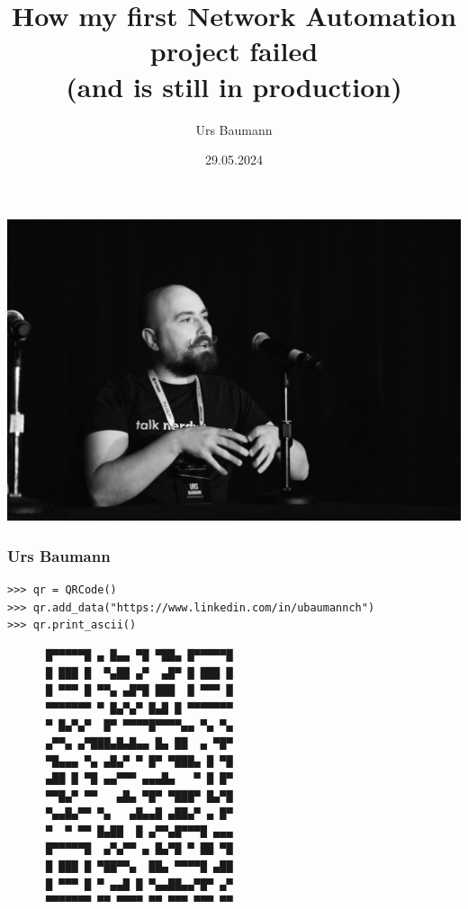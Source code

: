 \documentclass[aspectratio=169]{beamer}
\title[How my first Network Automation project failed (and is still in production)]{How my first Network Automation project failed \\ (and is still in production)}
\author{Urs Baumann}
\institute{Swisscom}
\date{29.05.2024}
\begin{document}
{
{
  \includegraphics[height=\paperheight]{images/AutoCon_0-108.jpg}
}
\frame{\titlepage}
}



\begin{frame}[fragile]
  \frametitle{Urs Baumann}

  \begin{verbatim}
>>> qr = QRCode()
>>> qr.add_data("https://www.linkedin.com/in/ubaumannch")
>>> qr.print_ascii()
  \end{verbatim}
  \begin{verbatim}
      █▀▀▀▀▀█ ▄ █▄▄ ▀█ ▀██▄ █▀▀▀▀▀█
      █ ███ █  ▀▄██ ▄▀  ▄█▀ █ ███ █
      █ ▀▀▀ █ ▀▀▄ ▄█▀█ ███  █ ▀▀▀ █
      ▀▀▀▀▀▀▀ ▀ █▄▀▄▀ █▄█ █ ▀▀▀▀▀▀▀
      ▀ █▄▀▄▀  █▀ ▀▀▀▀█▀▀▀▀▄▄ ▀▄ ▀▄
      ▄▀▀▄ ▄▀███▄█▄█▄▄ █▄ ██  ▄ ▀█▀
      ▀█▄▄▄ ▀▄ ▄█▄▀ ▀ █▀ ▀███▄ █ ▀█
      ▄██ █ ▀█ ▄▄▀▀▀ ▄▄▄█▄   ▀ █ █▀
      ▀▀█▄▀ ▀▀   ▄█▄ ▀█▀ ▀███▀ █▄▀█
      ▀▄▄█▄▀▀ ▀▄   ▄█▄▄█ ▄██▄▀ ▄ █▀
      ▀  ▀ ▀▀ █▄██  █ ▄▀▀▄█▀▀▀█ ▄▄▄
      █▀▀▀▀▀█  ▄▀▄▀▀ ▄ █▄▀█ ▀ ██ ▀█
      █ ███ █ ▀██▀▀▄  ██▄ ▀▀▀▀█ ▄██
      █ ▀▀▀ █ ▀ ▄▄█ █ ▀▄▄██▄▄▀█▀ ▄▀
      ▀▀▀▀▀▀▀ ▀▀ ▀▀▀▀ ▀▀ ▀▀▀ ▀▀▀ ▀▀
  \end{verbatim}
\end{frame}


\end{document}
